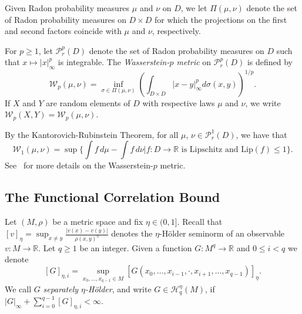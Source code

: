 \documentclass[11pt,a4paper,reqno,oneside]{amsart}
\newcommand{\R}{\ensuremath{\mathbb{R}}}%
\newcommand{\norminf}[1]{\left|#1\right|_\infty}
\newcommand{\ms}{M}
\newcommand{\map}[2]{\colon#1\rightarrow#2}
\newcommand{\Lip}{\mathrm{Lip}}
\newcommand{\wass}{\mathcal{W}}
\newcommand{\kant}{\wass_1}
\newcommand{\sepdholsp}[1]{\mathcal{H}^\eta_{#1}}
\newcommand{\dsemi}[1]{[#1]_{\eta}}
\newcommand{\sdsemi}[2]{[#1]_{\eta,#2}}
\theoremstyle{definition}
\theoremstyle{remark}
\numberwithin{equation}{section}
\begin{document}
	Given Radon probability measures $\mu$ and $\nu$ on $D$, we let $\Pi(\mu,\nu)$ denote the set of Radon probability measures on $D\times D$ for which the projections on the first and second factors coincide with $ \mu $ and $ \nu $, respectively.
	
	
	For $ p\ge 1 $, let $ \mathcal{P}_r^p(D) $ denote the set of Radon probability measures on $ D $ such that $ x\mapsto \norminf{x}^p $ is integrable. The \textit{Wasserstein-$ p $ metric} on $ \mathcal{P}_r^p(D) $ is defined by 
	\[ \wass_p(\mu,\nu)=\inf_{\sigma\in \Pi(\mu,\nu)}\left(\int_{D\times D}\norminf{x-y}^pd\sigma(x,y)\right)^{1/p}. \]
	If $X$ and $Y$ are random elements of $D$ with respective laws $\mu$ and $\nu$, we write $\wass_p(X,Y)=\wass_p(\mu,\nu)$.
	
	By the Kantorovich-Rubinstein Theorem, for all $\mu$, $\nu\in \mathcal{P}_r^1(D)$, we have that
	\begin{equation}\label{eq:kantorovich_rubenstein}
		\kant(\mu,\nu) = \sup\bigg\{\int f\, d\mu-\int f\, d\nu \bigg| f:D\to \R\text{ is Lipschitz and } \Lip(f)\le 1 \bigg\}.
	\end{equation}
	See~\cite[Chapter 3]{bogachev_weak_conv} for more details on the Wasserstein-$p$ metric.
	\subsection{The Functional Correlation Bound}
	Let $ (M,\rho) $ be a metric space and fix $ \eta\in(0,1] $. Recall that $\dsemi{v}=\sup_{x\ne y}\frac{|v(x)-v(y)|}{\rho(x,y)^\eta}$ denotes the $\eta$-H\"older seminorm of an observable $v:M\to \R$. Let $ q\ge 1$ be an integer. Given a function $ G\map{\ms^{q}}{\R} $ and $ 0\le i< q$ we denote
		\[\sdsemi{G}{i} =\sup_{x_0,\dots,x_{q-1}\in \ms}\dsemi{G(x_0,\dots,x_{i-1},\cdot,x_{i+1},\dots,x_{q-1})}. \]
		We call $ G $ \textit{separately $ \eta $-H\"older}, and write $ G\in \sepdholsp{q}(\ms)$, if $ \norminf{G}+\sum_{i=0}^{q-1} \sdsemi{G}{i}{<\infty}. $
\end{document}
